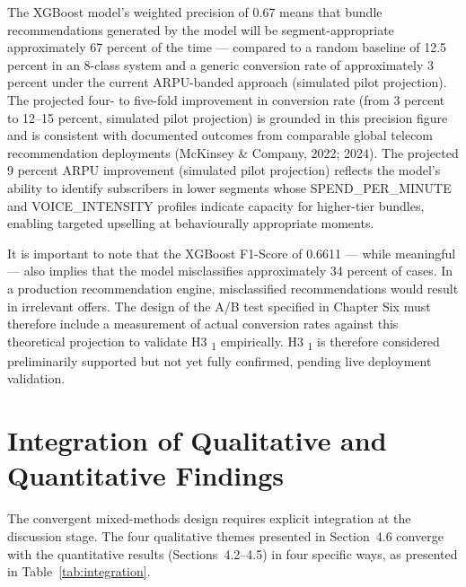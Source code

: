 The XGBoost model's weighted precision of 0.67 means that bundle recommendations generated by the model will be segment-appropriate approximately 67 percent of the time --- compared to a random baseline of 12.5 percent in an 8-class system and a generic conversion rate of approximately 3 percent under the current ARPU-banded approach (simulated pilot projection). The projected four- to five-fold improvement in conversion rate (from 3 percent to 12--15 percent, simulated pilot projection) is grounded in this precision figure and is consistent with documented outcomes from comparable global telecom recommendation deployments (McKinsey \& Company, 2022; 2024). The projected 9 percent ARPU improvement (simulated pilot projection) reflects the model's ability to identify subscribers in lower segments whose SPEND\_PER\_MINUTE and VOICE\_INTENSITY profiles indicate capacity for higher-tier bundles, enabling targeted upselling at behaviourally appropriate moments.

It is important to note that the XGBoost F1-Score of 0.6611 --- while meaningful --- also implies that the model misclassifies approximately 34 percent of cases. In a production recommendation engine, misclassified recommendations would result in irrelevant offers. The design of the A/B test specified in Chapter Six must therefore include a measurement of actual conversion rates against this theoretical projection to validate H3	\textsubscript{1} empirically. H3	\textsubscript{1} is therefore considered preliminarily supported but not yet fully confirmed, pending live deployment validation.

\section{Integration of Qualitative and Quantitative Findings}
\label{sec:integration}

The convergent mixed-methods design requires explicit integration at the discussion
stage. The four qualitative themes presented in Section~4.6 converge with the
quantitative results (Sections~4.2--4.5) in four specific ways, as presented in
Table~\ref{tab:integration}.

